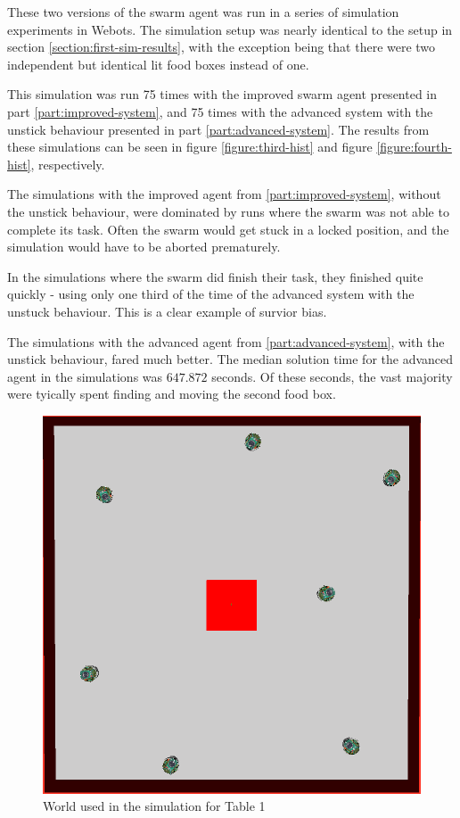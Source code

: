 \documentclass[a4paper]{article}
\begin{document}
These two versions of the swarm agent was run in a series of simulation experiments in Webots. The simulation setup was nearly identical to the setup in section \vref{section:first-sim-results}, with the exception being that there were two independent but identical lit food boxes instead of one.

This simulation was run 75 times with the improved swarm agent presented in part \vref{part:improved-system}, and 75 times with the advanced system with the unstick behaviour presented in part \vref{part:advanced-system}.
The results from these simulations can be seen in figure \vref{figure:third-hist} and figure \vref{figure:fourth-hist}, respectively.

The simulations with the improved agent from \ref{part:improved-system}, without the unstick behaviour, were dominated by runs where the swarm was not able to complete its task.
Often the swarm would get stuck in a locked position, and the simulation would have to be aborted prematurely.

In the simulations where the swarm did finish their task, they finished quite quickly - using only one third of the time of the advanced system with the unstuck behaviour.
This is a clear example of survior bias.

The simulations with the advanced agent from \ref{part:advanced-system}, with the unstick behaviour, fared much better.
The median solution time for the advanced agent in the simulations was $ 647.872 $ seconds.
Of these seconds, the vast majority were tyically spent finding and moving the second food box.




\begin{figure}[H]
\centering
\includegraphics[scale=0.5]{one-box-world.png}
\caption{World used in the simulation for Table 1}
\end{figure}



\newpage
{}


\end{document}
